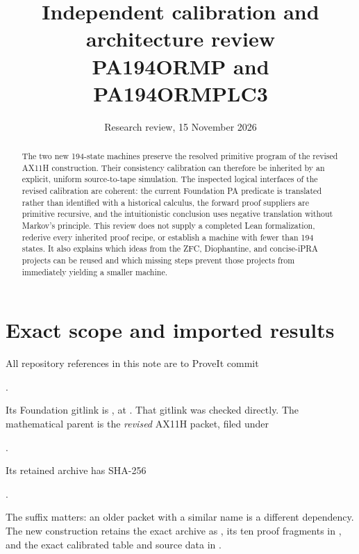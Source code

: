 \documentclass[11pt]{article}
\title{Independent calibration and architecture review\\
\large PA194ORMP and PA194ORMPLC3}
\author{Research review, 15 November 2026}
\date{}
\begin{document}
\maketitle

\begin{abstract}
The two new 194-state machines preserve the resolved primitive program of
the revised AX11H construction.  Their consistency calibration can therefore
be inherited by an explicit, uniform source-to-tape simulation.  The
inspected logical interfaces of the revised calibration are coherent:
the current Foundation PA predicate is translated rather than identified
with a historical calculus, the forward proof suppliers are primitive
recursive, and the intuitionistic conclusion uses negative translation
without Markov's principle.  This review does not supply a completed Lean
formalization, rederive every inherited proof recipe, or establish a
machine with fewer than 194 states.  It also explains which ideas from the
ZFC, Diophantine, and concise-iPRA projects can be reused and which missing
steps prevent those projects from immediately yielding a smaller machine.
\end{abstract}

\section{Exact scope and imported results}

All repository references in this note are to ProveIt commit
\begin{center}\small
{}.
\end{center}
Its Foundation gitlink is
, at
.  That gitlink was checked
directly.  The mathematical parent is the \emph{revised} AX11H packet,
filed under
\begin{center}\small
{}.
\end{center}
Its retained archive has SHA-256
\begin{center}\small
{}.
\end{center}
The suffix  matters: an older packet with a similar name is a
different dependency.  The new construction retains the exact archive
as , its ten proof fragments in
, and the exact calibrated table and source data in
.
\end{document}

